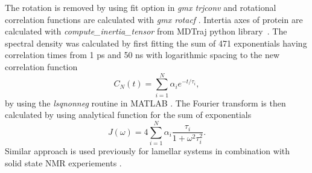 \documentclass[pre,aps,floatfix,authordate1-4,twocolumn]{revtex4-1}
\begin{document}
The rotation is removed by using fit option in {\it gmx trjconv} and rotational
correlation functions are calculated with {\it gmx rotacf} \cite{gromacsMANUAL}.
Intertia axes of protein are calculated with {\it compute\_inertia\_tensor} from
MDTraj python library~\cite{McGibbon2015MDTraj}.
The spectral density was calculated by first fitting the sum of 471 exponentials
having correlation times from 1 ps and 50 ns with logarithmic spacing to the new
correlation function 
\begin{equation}\label{gprime_fit}
C_N(t)=\sum_{i=1}^{N}\alpha_i e^{-t/\tau_i},
\end{equation}
by using the {\it lsqnonneg} routine in MATLAB \cite{matlab}.
The Fourier transform is then calculated by using analytical function
for the sum of exponentials 
\begin{equation}\label{FTanal}
J(\omega) =  4 \sum_{i=1}^{N}\alpha_i\frac{\tau_i}{1+\omega^2\tau_i^2}.
\end{equation}
Similar approach is used previously for lamellar systems in combination
with solid state NMR experiements \cite{nowacka13,ferreira15}.
\end{document}
